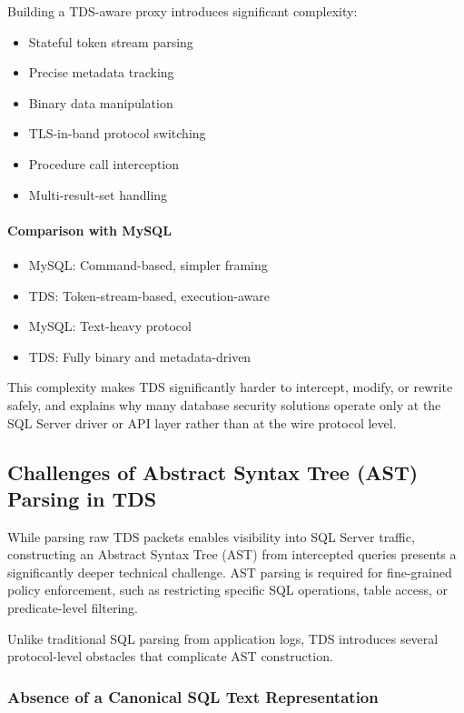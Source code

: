 Building a TDS-aware proxy introduces significant complexity:

\begin{itemize}
    \item Stateful token stream parsing
    \item Precise metadata tracking
    \item Binary data manipulation
    \item TLS-in-band protocol switching
    \item Procedure call interception
    \item Multi-result-set handling
\end{itemize}

\paragraph{Comparison with MySQL}

\begin{itemize}
    \item MySQL: Command-based, simpler framing
    \item TDS: Token-stream-based, execution-aware
    \item MySQL: Text-heavy protocol
    \item TDS: Fully binary and metadata-driven
\end{itemize}

This complexity makes TDS significantly harder to intercept, modify, or rewrite safely, and explains why many database security solutions operate only at the SQL Server driver or API layer rather than at the wire protocol level.

\subsection{Challenges of Abstract Syntax Tree (AST) Parsing in TDS}

While parsing raw TDS packets enables visibility into SQL Server traffic, constructing an Abstract Syntax Tree (AST) from intercepted queries presents a significantly deeper technical challenge. AST parsing is required for fine-grained policy enforcement, such as restricting specific SQL operations, table access, or predicate-level filtering.

Unlike traditional SQL parsing from application logs, TDS introduces several protocol-level obstacles that complicate AST construction.

\subsubsection{Absence of a Canonical SQL Text Representation}

